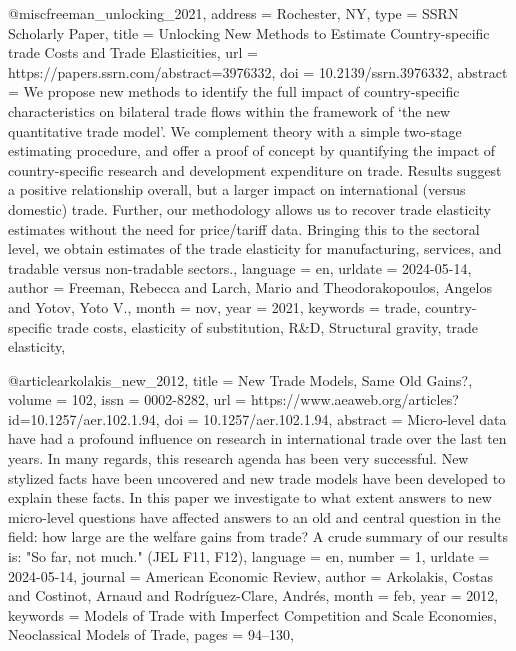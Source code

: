 {{{{@misc{freeman_unlocking_2021,
	address = {Rochester, NY},
	type = {{SSRN} {Scholarly} {Paper}},
	title = {Unlocking {New} {Methods} to {Estimate} {Country}-specific trade {Costs} and {Trade} {Elasticities}},
	url = {https://papers.ssrn.com/abstract=3976332},
	doi = {10.2139/ssrn.3976332},
	abstract = {We propose new methods to identify the full impact of country-specific characteristics on bilateral trade flows within the framework of ‘the new quantitative trade model’. We complement theory with a simple two-stage estimating procedure, and offer a proof of concept by quantifying the impact of country-specific research and development expenditure on trade. Results suggest a positive relationship overall, but a larger impact on international (versus domestic) trade. Further, our methodology allows us to recover trade elasticity estimates without the need for price/tariff data. Bringing this to the sectoral level, we obtain estimates of the trade elasticity for manufacturing, services, and tradable versus non-tradable sectors.},
	language = {en},
	urldate = {2024-05-14},
	author = {Freeman, Rebecca and Larch, Mario and Theodorakopoulos, Angelos and Yotov, Yoto V.},
	month = nov,
	year = {2021},
	keywords = {trade, country-specific trade costs, elasticity of substitution, R\&D, Structural gravity, trade elasticity},
}

@article{arkolakis_new_2012,
	title = {New {Trade} {Models}, {Same} {Old} {Gains}?},
	volume = {102},
	issn = {0002-8282},
	url = {https://www.aeaweb.org/articles?id=10.1257/aer.102.1.94},
	doi = {10.1257/aer.102.1.94},
	abstract = {Micro-level data have had a profound influence on research in international trade over the last ten years. In many regards, this research agenda has been very successful. New stylized facts have been uncovered and new trade models have been developed to explain these facts. In this paper we investigate to what extent answers to new micro-level questions have affected answers to an old and central question in the field: how large are the welfare gains from trade? A crude summary of our results is: "So far, not much." (JEL F11, F12)},
	language = {en},
	number = {1},
	urldate = {2024-05-14},
	journal = {American Economic Review},
	author = {Arkolakis, Costas and Costinot, Arnaud and Rodríguez-Clare, Andrés},
	month = feb,
	year = {2012},
	keywords = {Models of Trade with Imperfect Competition and Scale Economies, Neoclassical Models of Trade},
	pages = {94--130},
}

}}}}
